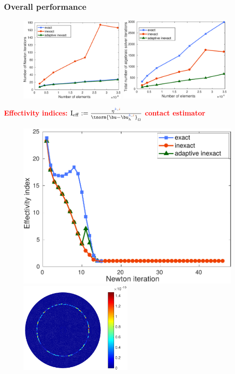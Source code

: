 \begin{frame}
\frametitle{Overall performance}
\begin{figure}
\includegraphics[width=0.47\textwidth]{fig_article_chap_1/comparison_three_methods_number_Newton_iter_number_elements.eps}  \quad  
 \includegraphics[width=0.50\textwidth]{fig_article_chap_1/comparison_three_methods_total_number_Newton_Gmres_iter_number_elements.eps}     
\end{figure}
\end{frame}


\begin{frame}
  \hspace{0.5 cm}\textcolor{red}{\textbf{Effectivity indices:}} $\mathrm{I}_{\mathrm{eff}} \egaldef \frac{\eta^{\kk,\ii}}{\tnorm{\bu-\bu_h^{\kk,\ii}}_{\Omega}}$ \hspace{3 cm} \textcolor{red}{\textbf{contact estimator}}
\begin{figure}
\includegraphics[width=0.47 \textwidth]{fig_article_chap_1/effectivity_index_3_methods_Hmax_015.pdf}   \quad 
\includegraphics[width=0.50\textwidth]{fig_article_chap_1/modif_fig_contact_estimator_hmax0,09_Dt0,001_tt180}     
\end{figure}
\end{frame}

